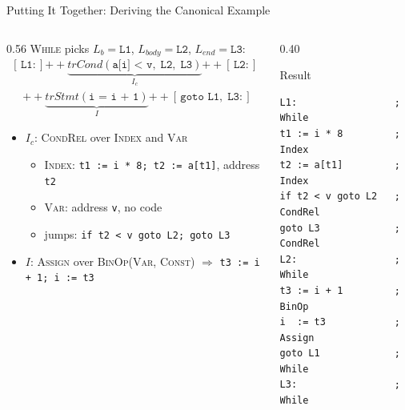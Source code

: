 \documentclass[aspectratio=169]{beamer}
\newcommand{\trStmt}[1]{\mathit{trStmt}(#1)}
\newcommand{\trCond}[3]{\mathit{trCond}(#1,\;#2,\;#3)}
\newcommand{\cat}{\mathbin{+\!\!+}}
\newcommand{\tc}[1]{\texttt{#1}}
\begin{document}
\begin{frame}[fragile]{Putting It Together: Deriving the Canonical Example}
  \begin{columns}[T]
    \begin{column}{0.56\textwidth}
      \footnotesize
      \textsc{While} picks $L_b = \tc{L1}$, $L_{\mathit{body}} = \tc{L2}$, $L_{\mathit{end}} = \tc{L3}$:
      \[
        \begin{array}{l}
        [\,\tc{L1:}\,] \cat \underbrace{\trCond{\tc{a[i] < v}}{\tc{L2}}{\tc{L3}}}_{I_c}
        \cat [\,\tc{L2:}\,] \\[1.2em]
        \quad \cat \underbrace{\trStmt{\tc{i = i + 1}}}_{I}
        \cat [\,\tc{goto L1},\; \tc{L3:}\,]
        \end{array}
      \]
      \begin{itemize}
        \item $I_c$: \textsc{CondRel} over \textsc{Index} and \textsc{Var}
          \begin{itemize}
            \item \textsc{Index}: \tc{t1 := i * 8;\ t2 := a[t1]}, address \tc{t2}
            \item \textsc{Var}: address \tc{v}, no code
            \item jumps: \tc{if t2 < v goto L2;\ goto L3}
          \end{itemize}
        \item $I$: \textsc{Assign} over \textsc{BinOp}(\textsc{Var}, \textsc{Const})
              $\Rightarrow$ \tc{t3 := i + 1;\ i := t3}
      \end{itemize}
    \end{column}
    \begin{column}{0.40\textwidth}
      \begin{block}{Result}
        \begin{verbatim}
L1:                 ; While
t1 := i * 8         ; Index
t2 := a[t1]         ; Index
if t2 < v goto L2   ; CondRel
goto L3             ; CondRel
L2:                 ; While
t3 := i + 1         ; BinOp
i  := t3            ; Assign
goto L1             ; While
L3:                 ; While
        \end{verbatim}
      \end{block}
    \end{column}
  \end{columns}
\end{frame}
\end{document}
